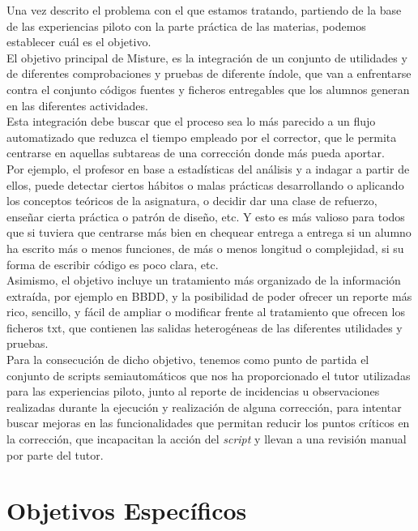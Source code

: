 Una vez descrito el problema con el que estamos tratando, partiendo de la base de las experiencias piloto con la parte práctica de las materias, podemos establecer cuál es el objetivo.\\


El objetivo principal de Misture, es la integración de un conjunto de utilidades y de diferentes comprobaciones y pruebas de diferente índole, que van a enfrentarse contra el conjunto códigos fuentes y ficheros entregables que los alumnos generan en las diferentes actividades.\\


Esta integración debe buscar que el proceso sea lo más parecido a un flujo automatizado que reduzca el tiempo empleado por el corrector, que le permita centrarse en aquellas subtareas de una corrección donde más pueda aportar.\\


Por ejemplo, el profesor en base a estadísticas del análisis y a indagar a partir de ellos, puede detectar ciertos hábitos o malas prácticas desarrollando o aplicando los conceptos teóricos de la asignatura, o decidir dar una clase de refuerzo, enseñar cierta práctica o patrón de diseño, etc. Y esto es más valioso para todos que si tuviera que centrarse más bien en chequear entrega a entrega si un alumno ha escrito más o menos funciones, de más o menos longitud o complejidad, si su forma de escribir código es poco clara, etc.\\


Asimismo, el objetivo incluye un tratamiento más organizado de la información extraída, por ejemplo en BBDD, y la posibilidad de poder ofrecer un reporte más rico, sencillo, y fácil de ampliar o modificar frente al tratamiento que ofrecen los ficheros txt, que contienen las salidas heterogéneas de las diferentes utilidades y pruebas.\\


Para la consecución de dicho objetivo, tenemos como punto de partida el conjunto de scripts semiautomáticos que nos ha proporcionado el tutor utilizadas para las experiencias piloto, junto al reporte de incidencias u observaciones realizadas durante la ejecución y realización de alguna corrección, para intentar buscar mejoras en las funcionalidades que permitan reducir los puntos críticos en la corrección, que incapacitan la acción del \textit{script} y llevan a una revisión manual por parte del tutor. \\


\section{Objetivos Específicos}
\label{sec:obj_esp}


